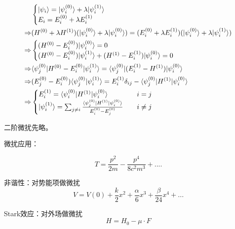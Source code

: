 \begin{description}
	\begin{align*}
	&\begin{cases}
	| \psi_i \rangle = | \psi_i^{(0)} \rangle+\lambda | \psi_i^{(1)} \rangle\\
	E_i=E_i^{(0)} + \lambda E_i^{(1)}
	\end{cases}\\
	\Rightarrow & (H^{(0)}+\lambda H^{(1)})(| \psi^{(0)}_i \rangle+\lambda | \psi_i^{(0)} \rangle)=(E_i^{(0)}+\lambda E^{(1)}_i)(| \psi_i^{(0)} \rangle+\lambda | \psi^{(1)}_i \rangle) \\
	\Rightarrow & \begin{cases}
	(H^{(0)}-E_i^{(0)})| \psi_i^{(0)} \rangle=0\\
	(H^{(0)}-E_i^{(0)})| \psi_i^{(1)} \rangle+(H^{(1)}-E_i^{(1)})| \psi_i^{(0)} \rangle =0
	\end{cases}\\
	\Rightarrow & \langle \psi_j^{(0)} | H^{(0)}-E_i^{(0)} | \psi_i^{(1)} \rangle=\langle \psi_j^{(0)} | (E_i^{(1)}-H^{(1)}) | \psi_i^{(0)} \rangle\\
	\Rightarrow & (E_j^{(0)}-E_i^{(0)})\langle \psi_j^{(0)} | \psi_i^{(1)} \rangle=E_i^{(1)}\delta_{ij} -\langle \psi^{(0)}_j | H^{(1)} | \psi_i^{(0)} \rangle\\
	\Rightarrow &
	\begin{cases}
	E_i^{(1)}=\langle \psi_i^{(0)} | H^{(1)} | \psi_i^{(0)} \rangle &\quad i=j \\
	| \psi_i^{(1)} \rangle=\sum_{j\neq i}\frac{\langle \psi^{(0)}_j | H^{(1)} | \psi^{(0)}_i \rangle}{E^{(0)}_i-E^{(0)}_j} &\quad i\neq j
	\end{cases}
	\end{align*}

	二阶微扰先略。

	微扰应用：

	\begin{equation}
	T=\frac{p^2}{2m}-\frac{p^4}{8c^2m^3}+....
	\end{equation}
	\begin{description}
		\item 非谐性：对势能项做微扰
		\begin{equation}
		V=V(0)+\frac{k}{2}x^2+\frac{\alpha}{6}x^3+\frac{\beta}{24}x^4+...
		\end{equation}
		\item Stark效应：对外场做微扰
		\begin{equation}
		H=H_0-\mu\cdot F
		\end{equation}
	\end{description}

		
\end{description}


